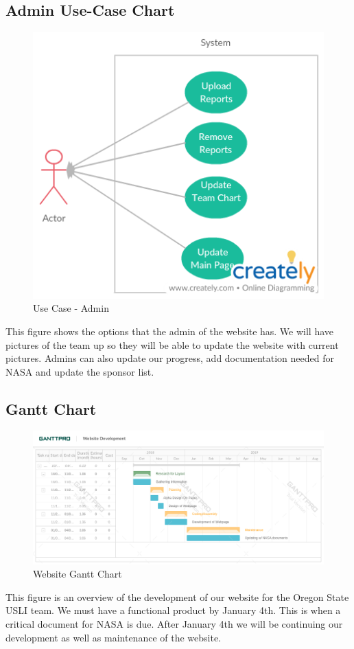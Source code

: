\documentclass[journal,10pt,draftclsnofoot,onecolumn,compsoc]{IEEEtran} \usepackage[margin=0.75in]{geometry}
\begin{document}
\subsection{Admin Use-Case Chart}
\begin{figure}[!htp]
    \centering
    \includegraphics[width = 1 \textwidth,angle=0]{Figures/Admin_User_Use_Case.png}
    \caption{Use Case - Admin}
    \label{fig:my_label}
\end{figure}
This figure shows the options that the admin of the website has. We will have pictures of the team up so they will be able to update the website with current pictures. Admins can also update our progress, add documentation needed for NASA and update the sponsor list. 

\newpage
\subsection{Gantt Chart}
\begin{figure}[!htp]
    \centering
    \includegraphics[width = 1 \textwidth,angle=0]{WebsiteDevelopment.png}
    \caption{Website Gantt Chart}
    \label{fig:my_label}
\end{figure}
This figure is an overview of the development of our website for the Oregon State USLI team. We must have a functional product by January 4th. This is when a critical document for NASA is due. After January 4th we will be continuing our development as well as maintenance of the website.  
\end{document}
